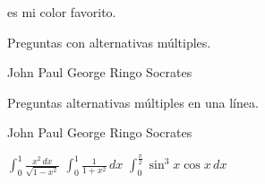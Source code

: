 \documentclass[%
    11pt,
    letterpaper,
    addpoints,
]{utfsm-exam}
\begin{document}
\begin{questions}
    \question[2] \fillin[Rojo][5cm] es mi color favorito.

    \question[4] Preguntas con alternativas múltiples.
    \begin{choices}
        \choice John
        \choice Paul
        \choice George
        \choice Ringo
        \CorrectChoice Socrates
    \end{choices}
    
    \question[4] Preguntas alternativas múltiples en una línea.
    
    \begin{oneparcheckboxes}
        \choice John
        \choice Paul
        \choice George
        \choice Ringo
        \CorrectChoice Socrates
    \end{oneparcheckboxes}
        

    
    \question[10]
    \label{exact-start}
    $\displaystyle \int_0^1 \frac{x^2 \, dx}{\sqrt{1-x^2}}$
    \question[10]
    $\displaystyle \int_0^1 \frac{1}{1+x^2}\, dx$
    \question[10]
    \label{exact-end}
    $\displaystyle \int_0^{\frac{\pi}{2}} \sin^3 x \cos x \, dx$
\end{questions}
\end{document}
